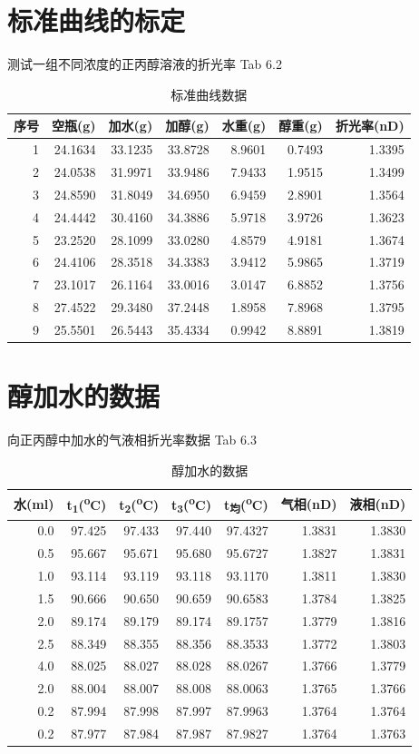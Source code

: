 \documentclass[11pt]{report}
\begin{document}
\section{标准曲线的标定}
\label{sec:org5ac83e5}
测试一组不同浓度的正丙醇溶液的折光率 Tab 6.2
\begin{table}[htbp]
\caption{\label{tab:orgec5feee}标准曲线数据}
\centering
\begin{tabular}{rrrrrrr}
序号 & 空瓶(g) & 加水(g) & 加醇(g) & 水重(g) & 醇重(g) & 折光率(nD)\\
\hline
1 & 24.1634 & 33.1235 & 33.8728 & 8.9601 & 0.7493 & 1.3395\\
2 & 24.0538 & 31.9971 & 33.9486 & 7.9433 & 1.9515 & 1.3499\\
3 & 24.8590 & 31.8049 & 34.6950 & 6.9459 & 2.8901 & 1.3564\\
4 & 24.4442 & 30.4160 & 34.3886 & 5.9718 & 3.9726 & 1.3623\\
5 & 23.2520 & 28.1099 & 33.0280 & 4.8579 & 4.9181 & 1.3674\\
6 & 24.4106 & 28.3518 & 34.3383 & 3.9412 & 5.9865 & 1.3719\\
7 & 23.1017 & 26.1164 & 33.0016 & 3.0147 & 6.8852 & 1.3756\\
8 & 27.4522 & 29.3480 & 37.2448 & 1.8958 & 7.8968 & 1.3795\\
9 & 25.5501 & 26.5443 & 35.4334 & 0.9942 & 8.8891 & 1.3819\\
\end{tabular}
\end{table}
\section{醇加水的数据}
\label{sec:org082f90a}
向正丙醇中加水的气液相折光率数据 Tab 6.3
\begin{table}[htbp]
\caption{\label{tab:orgc53916a}醇加水的数据}
\centering
\begin{tabular}{rrrrrrr}
水(ml) & t\textsubscript{1}(\textsuperscript{o}C) & t\textsubscript{2}(\textsuperscript{o}C) & t\textsubscript{3}(\textsuperscript{o}C) & t\textsubscript{均}(\textsuperscript{o}C) & 气相(nD) & 液相(nD)\\
\hline
0.0 & 97.425 & 97.433 & 97.440 & 97.4327 & 1.3831 & 1.3830\\
0.5 & 95.667 & 95.671 & 95.680 & 95.6727 & 1.3827 & 1.3831\\
1.0 & 93.114 & 93.119 & 93.118 & 93.1170 & 1.3811 & 1.3830\\
1.5 & 90.666 & 90.650 & 90.659 & 90.6583 & 1.3784 & 1.3825\\
2.0 & 89.174 & 89.179 & 89.174 & 89.1757 & 1.3779 & 1.3816\\
2.5 & 88.349 & 88.355 & 88.356 & 88.3533 & 1.3772 & 1.3803\\
4.0 & 88.025 & 88.027 & 88.028 & 88.0267 & 1.3766 & 1.3779\\
2.0 & 88.004 & 88.007 & 88.008 & 88.0063 & 1.3765 & 1.3766\\
0.2 & 87.994 & 87.998 & 87.997 & 87.9963 & 1.3764 & 1.3764\\
0.2 & 87.977 & 87.984 & 87.987 & 87.9827 & 1.3764 & 1.3763\\
\end{tabular}
\end{table}
\end{document}
